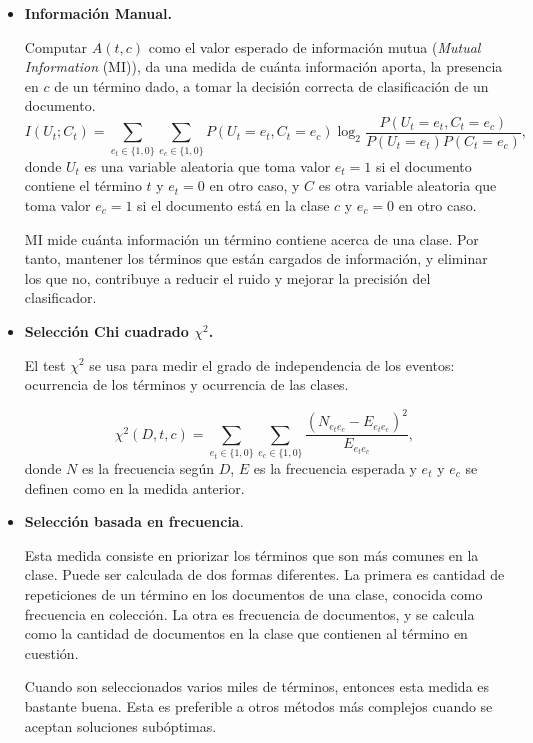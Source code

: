 \documentclass[t,compress,10pt,xcolor=dvipsnames]{beamer}
\begin{document}
{		\begin{itemize}
			\item\textbf{Informaci\'on Manual.}
			\smallskip
			
			Computar $A(t,c)$ como el valor esperado de informaci\'on mutua (\emph{Mutual Information} (MI)), da una medida de cu\'anta informaci\'on aporta, la presencia en $c$ de un t\'ermino dado, a tomar la decisi\'on correcta de clasificaci\'on de un documento. 
			\[
			I(U_t;C_t) = \sum_{e_t \in \{ 1,0 \} } \sum_{e_c \in \{ 1,0 \} } P( U_t = e_t, C_t = e_c) \log_2 \frac{P (U_t = e_t, C_t = e_c) }{ P(U_t = e_t) P(C_t = e_c) },
			\]
			donde $U_t$ es una variable aleatoria que toma valor $e_t = 1$ si el documento contiene el t\'ermino $t$ y $e_t = 0$ en otro caso, y $C$ es otra variable aleatoria que toma valor $e_c = 1$ si el documento est\'a en la clase $c$ y $e_c = 0  $ en otro caso. 
			
			\smallskip
			
		\framebreak
			
			MI mide cu\'anta informaci\'on un t\'ermino contiene acerca de una clase. Por tanto, mantener los t\'erminos que est\'an cargados de informaci\'on, y eliminar los que no, contribuye a reducir el ruido y mejorar la precisi\'on del clasificador.
			
			\smallskip
			
		\framebreak
			
			\item\textbf{Selecci\'on Chi cuadrado $\chi^2$.} 
			\smallskip
			
			El test $\chi^2$ se usa para medir el grado de independencia de los eventos: ocurrencia de los t\'erminos y ocurrencia de las clases. 
			
			\[
			\chi^2(D,t,c) = \sum_{e_t\in \{ 1, 0 \}} \sum_{e_c\in \{ 1, 0 \}} \frac{(N_{e_te_c} - E_{e_t e_c}) ^2 } { E_{e_t e_c}},
			\]
			donde $N$ es la frecuencia seg\'un $D$, $E$ es la frecuencia esperada y $e_t$ y  $e_c$ se definen como en la medida anterior.
			
			\smallskip
			
		\framebreak
		
			\item \textbf{Selecci\'on basada en frecuencia}.
			\smallskip
			
			Esta medida consiste en priorizar los t\'erminos que son m\'as comunes en la  clase. Puede ser calculada de dos formas diferentes. La primera es cantidad de repeticiones de un t\'ermino en los documentos de una clase, conocida como frecuencia en colecci\'on. La otra es frecuencia de documentos, y se calcula como la cantidad de documentos en la clase que contienen al t\'ermino en cuesti\'on.
			
			\smallskip
			
			Cuando son seleccionados varios miles de t\'erminos, entonces esta medida es bastante buena. Esta es preferible a otros m\'etodos m\'as complejos cuando se aceptan soluciones sub\'optimas.
			
		\end{itemize}
		
		
	}
\end{document}
